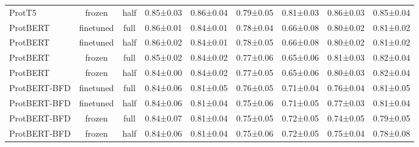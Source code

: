 \begin{tabular}{lcccccccc}
      ProtT5 &         frozen &      half & 0.85±0.03 & 0.86±0.04 & 0.79±0.05 & 0.81±0.03 & 0.86±0.03 & 0.85±0.04 \\
    ProtBERT &      finetuned &      full & 0.86±0.01 & 0.84±0.01 & 0.78±0.04 & 0.66±0.08 & 0.80±0.02 & 0.81±0.02 \\
    ProtBERT &      finetuned &      half & 0.86±0.02 & 0.84±0.01 & 0.78±0.05 & 0.66±0.08 & 0.80±0.02 & 0.81±0.02 \\
    ProtBERT &         frozen &      full & 0.85±0.02 & 0.84±0.02 & 0.77±0.06 & 0.65±0.06 & 0.81±0.03 & 0.82±0.04 \\
    ProtBERT &         frozen &      half & 0.84±0.00 & 0.84±0.02 & 0.77±0.05 & 0.65±0.06 & 0.80±0.03 & 0.82±0.04 \\
ProtBERT-BFD &      finetuned &      full & 0.84±0.06 & 0.81±0.05 & 0.76±0.05 & 0.71±0.04 & 0.76±0.04 & 0.81±0.05 \\
ProtBERT-BFD &      finetuned &      half & 0.84±0.06 & 0.81±0.04 & 0.75±0.06 & 0.71±0.05 & 0.77±0.03 & 0.81±0.04 \\
ProtBERT-BFD &         frozen &      full & 0.84±0.07 & 0.81±0.04 & 0.75±0.05 & 0.72±0.05 & 0.74±0.05 & 0.79±0.05 \\
ProtBERT-BFD &         frozen &      half & 0.84±0.06 & 0.81±0.04 & 0.75±0.06 & 0.72±0.05 & 0.75±0.04 & 0.78±0.08 \\
\bottomrule
\end{tabular}
